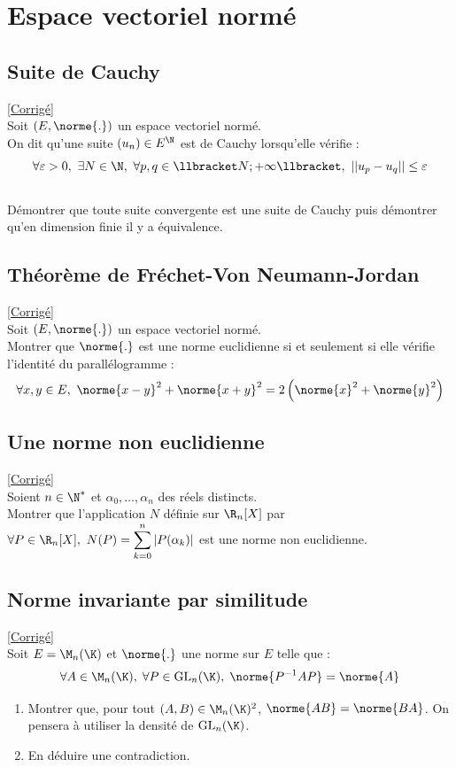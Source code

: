 \documentclass{book}
\begin{document}
	
\chapter{Espace vectoriel normé}
	\section{Suite de Cauchy }
	\textcolor{blue}{\hyperref[sec:suite-de-cauchy-etoile-2]{[Corrigé]}}\\
	\label{Suite de Cauchy}
	Soit $(E,\norme{.})$ un espace vectoriel normé.\\
	On dit qu'une suite $(u_n)\in E^\N$ est de Cauchy lorsqu'elle vérifie :
	$$\forall \varepsilon>0,\ \exists N\in \N,\ \forall p,q\in \llbracket N;+\infty\llbracket,\ ||u_p-u_q||\leq \varepsilon$$
	\\Démontrer que toute suite convergente est une suite de Cauchy puis démontrer qu'en dimension finie il y a équivalence.
	
	\section{Théorème de Fréchet-Von Neumann-Jordan}
	\textcolor{blue}{\hyperref[sec:theoreme-de-frechet-von-neumann]{[Corrigé]}}\\
	\label{Théorème de Fréchet-Von Neumann-Jordan}
	Soit $(E,\norme{.})$ un espace vectoriel normé.\\
	Montrer que $\norme{.}$ est une norme euclidienne si et seulement si elle vérifie l'identité du parallélogramme :
	$$\forall x,y\in E,\ \norme{x-y}^2+\norme{x+y}^2=2\left(\norme{x}^2+\norme{y}^2\right)$$
	
	\section{Une norme non euclidienne}
	\textcolor{blue}{\hyperref[sec:une-norme-non-euclidienne]{[Corrigé]}}\\
	\label{Une norme non euclidienne}
	Soient $n\in \N^*$ et $\alpha_0,\dots,\alpha_n$ des réels distincts. \\
	Montrer que l'application $N$ définie sur $\R_n[X]$ par $\forall P\in \R_n[X],\ N(P)=\displaystyle\sum_{k=0}^n|P(\alpha_k)|$ est une norme non euclidienne.
	
	\section{Norme invariante par similitude}
	\textcolor{blue}{\hyperref[sec:norme-invariante-par-similitude]{[Corrigé]}}\\
	\label{Norme invariante par similitude}
	Soit $E=\M_n(\K)$ et $\norme{.}$ une norme sur $E$ telle que : $$\forall A\in\M_n(\K), \; \forall P\in \text{GL}_n(\K), \; \norme{P^{-1}AP}=\norme{A}$$
	\begin{enumerate}
		\item Montrer que, pour tout $(A,B)\in\M_n(\K)^2$, $\norme{AB}=\norme{BA}$. On pensera à utiliser la densité de $\text{GL}_n(\K)$.
		\item En déduire une contradiction.
	\end{enumerate}
	
\end{document}
